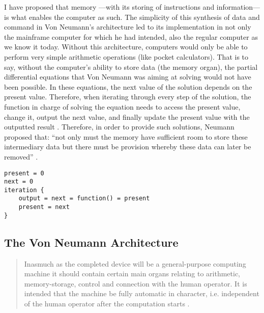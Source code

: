 I have proposed that memory ---with its storing of instructions and information--- is what enables the computer as such. The simplicity of this synthesis of data and command in Von Neumann's architecture led to its implementation in not only the mainframe computer for which he had intended, also the regular computer as we know it today. Without this architecture, computers would only be able to perform very simple arithmetic operations (like pocket calculators). That is to say, without the computer's ability to store data (the memory organ), the partial differential equations that Von Neumann was aiming at solving would not have been possible. In these equations, the next value of the solution depends on the present value. Therefore, when iterating through every step of the solution, the function in charge of solving the equation needs to access the present value, change it, output the next value, and finally update the present value with the outputted result . Therefore, in order to provide such solutions, Neumann proposed that: ``not only must the memory have sufficient room to store these intermediary data but there must be provision whereby these data can later be removed'' \parencite[3]{von46:Pre}.

\begin{flushleft}
\small
\begin{lstlisting}[caption={Pseudocode showing a routine whose next value depends on the present value.},captionpos=b,label={lst:neumann}]
present = 0
next = 0
iteration {
	output = next = function() = present
	present = next
}
\end{lstlisting}
\end{flushleft}


\subsection{The Von Neumann Architecture}

\begin{quote}
	Inasmuch as the completed device will be a general-purpose computing machine it should contain certain main organs relating to arithmetic, memory-storage, control and connection with the human operator. It is intended that the machine be fully automatic in character, i.e. independent of the human operator after the computation starts \parencite[1]{von46:Pre}.
\end{quote}

